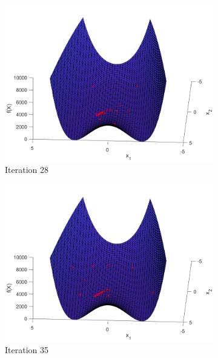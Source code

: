 \begin{figure}
\begin{subfigure}[b]{0.4\textwidth}
    \includegraphics[width=\textwidth]{img/smpl/rosn2d-1-100/loa-iter-28}
    \caption{Iteration 28}
    \label{fig:s3-iter-4}
  \end{subfigure}
  \begin{subfigure}[b]{0.4\textwidth}
    \includegraphics[width=\textwidth]{img/smpl/rosn2d-1-100/loa-iter-35}
    \caption{Iteration 35}
    \label{fig:s3-iter-5}
  \end{subfigure}
  \begin{subfigure}[b]{0.4\textwidth}

\end{subfigure}
\end{figure}
